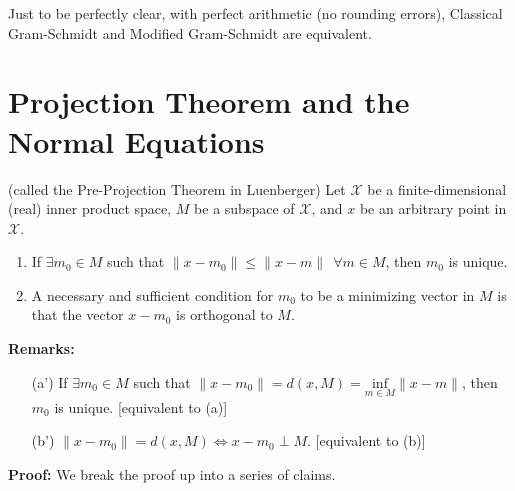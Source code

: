   \begin{rem}
Just to be perfectly clear, with perfect arithmetic (no rounding errors), Classical Gram-Schmidt and Modified Gram-Schmidt are equivalent. 
  \end{rem}
 
 \section{Projection Theorem and the Normal Equations}
 
\begin{lem} (called the Pre-Projection Theorem in Luenberger)
\label{lem:PreProjThm}
Let $\mathcal{X}$ be a finite-dimensional (real) inner product space, $M$ be a subspace of $\mathcal{X}$, and $x$ be an arbitrary point in $\mathcal{X}$.
    \begin{enumerate}
            \renewcommand{\labelenumi}{(\alph{enumi})}
        \setlength{\itemsep}{.1cm}
        \item If $\exists m_0 \in M $ such that $\|x-m_0\| \leq \|x-m\| \ \ \forall m \in M$, then $m_0$ is unique.
        \item A necessary and sufficient condition for $m_0$ to be a minimizing vector in $M$ is that the vector $x-m_0$ is orthogonal to $M$.
    \end{enumerate}
        
\end{lem}

\textbf{Remarks:}
    \begin{enumerate}
        \item[(a')] If $\exists m_0 \in M$ such that $\|x-m_0\| = d(x,M) = \underset{m \in M}{\text{inf}} \|x-m\|$, then $m_0$ is unique. [equivalent to (a)]
        \item[(b')] $\|x-m_0\| = d(x,M) \iff x-m_0 \perp M$. [equivalent to (b)]
    \end{enumerate}

\textbf{Proof:} We break the proof up into a series of claims.

